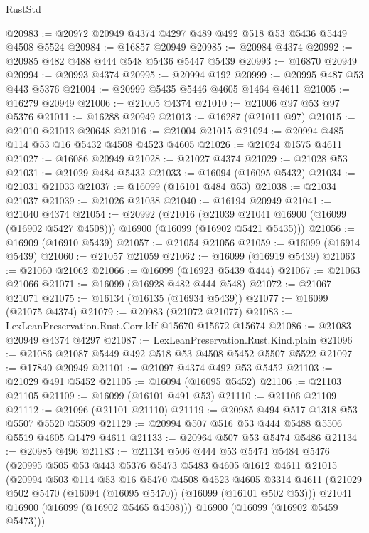 \begin{lexlean}{RustStd}
\begin{coremodule}
@20983 := @20972 @20949 @4374 @4297 @489 @492 @518 @53 @5436 @5449 @4508 @5524
@20984 := @16857 @20949
@20985 := @20984 @4374
@20992 := @20985 @482 @488 @444 @548 @5436 @5447 @5439
@20993 := @16870 @20949
@20994 := @20993 @4374
@20995 := @20994 @192
@20999 := @20995 @487 @53 @443 @5376
@21004 := @20999 @5435 @5446 @4605 @1464 @4611
@21005 := @16279 @20949
@21006 := @21005 @4374
@21010 := @21006 @97 @53 @97 @5376
@21011 := @16288 @20949
@21013 := @16287 (@21011 @97)
@21015 := @21010 @21013 @20648
@21016 := @21004 @21015
@21024 := @20994 @485 @114 @53 @16 @5432 @4508 @4523 @4605
@21026 := @21024 @1575 @4611
@21027 := @16086 @20949
@21028 := @21027 @4374
@21029 := @21028 @53
@21031 := @21029 @484 @5432
@21033 := @16094 (@16095 @5432)
@21034 := @21031 @21033
@21037 := @16099 (@16101 @484 @53)
@21038 := @21034 @21037
@21039 := @21026 @21038
@21040 := @16194 @20949
@21041 := @21040 @4374
@21054 := @20992
    (@21016
      (@21039 @21041 @16900 (@16099 (@16902 @5427 @4508)))
      @16900
      (@16099 (@16902 @5421 @5435)))
@21056 := @16909 (@16910 @5439)
@21057 := @21054 @21056
@21059 := @16099 (@16914 @5439)
@21060 := @21057 @21059
@21062 := @16099 (@16919 @5439)
@21063 := @21060 @21062
@21066 := @16099 (@16923 @5439 @444)
@21067 := @21063 @21066
@21071 := @16099 (@16928 @482 @444 @548)
@21072 := @21067 @21071
@21075 := @16134 (@16135 (@16934 @5439))
@21077 := @16099 (@21075 @4374)
@21079 := @20983 (@21072 @21077)
@21083 := LexLeanPreservation.Rust.Corr.kIf @15670 @15672 @15674
@21086 := @21083 @20949 @4374 @4297
@21087 := LexLeanPreservation.Rust.Kind.plain
@21096 := @21086 @21087 @5449 @492 @518 @53 @4508 @5452 @5507 @5522
@21097 := @17840 @20949
@21101 := @21097 @4374 @492 @53 @5452
@21103 := @21029 @491 @5452
@21105 := @16094 (@16095 @5452)
@21106 := @21103 @21105
@21109 := @16099 (@16101 @491 @53)
@21110 := @21106 @21109
@21112 := @21096 (@21101 @21110)
@21119 := @20985 @494 @517 @1318 @53 @5507 @5520 @5509
@21129 := @20994 @507 @516 @53 @444 @5488 @5506 @5519 @4605 @1479 @4611
@21133 := @20964 @507 @53 @5474 @5486
@21134 := @20985 @496
@21183 := @21134
    @506
    @444
    @53
    @5474
    @5484
    @5476
    (@20995
      @505
      @53
      @443
      @5376
      @5473
      @5483
      @4605
      @1612
      @4611
      @21015
      (@20994
        @503
        @114
        @53
        @16
        @5470
        @4508
        @4523
        @4605
        @3314
        @4611
        (@21029 @502 @5470 (@16094 (@16095 @5470)) (@16099 (@16101 @502 @53)))
        @21041
        @16900
        (@16099 (@16902 @5465 @4508)))
      @16900
      (@16099 (@16902 @5459 @5473)))

\end{coremodule}
\end{lexlean}
